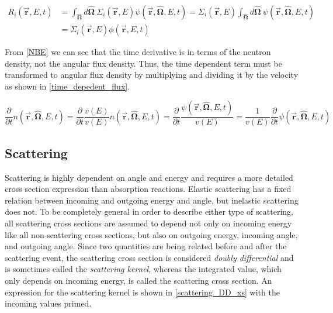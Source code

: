 \begin{align}
\label{scalar_flux_RR}
 R_i(\boldsymbol{\vec{r}},E,t) &= \int_{\boldsymbol{\hat{\Omega}}} d\boldsymbol{\hat{\Omega}} \: \Sigma_i(\boldsymbol{\vec{r}},E) \psi(\boldsymbol{\vec{r}},\boldsymbol{\hat{\Omega}},E,t) = \Sigma_i(\boldsymbol{\vec{r}},E) \int_{\boldsymbol{\hat{\Omega}}} d\boldsymbol{\hat{\Omega}} \: \psi(\boldsymbol{\vec{r}},\boldsymbol{\hat{\Omega}},E,t) \nonumber\\
 &= \Sigma_i(\boldsymbol{\vec{r}},E) \phi(\boldsymbol{\vec{r}},E,t)
 \end{align}
 
From \eqref{NBE} we can see that the time derivative is in terms of the neutron density, not the angular flux density.  Thus, the time dependent term must be transformed to angular flux density by multiplying and dividing it by the velocity as shown in \eqref{time_depedent_flux}.

\begin{equation}
\label{time_depedent_flux}
\frac{\partial }{\partial t}n(\boldsymbol{\vec{r}},\boldsymbol{\hat{\Omega}},E,t) = \frac{\partial }{\partial t}  \frac{v(E)}{v(E)} n(\boldsymbol{\vec{r}},\boldsymbol{\hat{\Omega}},E,t) =  \frac{\partial }{\partial t}  \frac{\psi(\boldsymbol{\vec{r}},\boldsymbol{\hat{\Omega}},E,t)}{v(E)} = \frac{1}{v(E)} \frac{\partial }{\partial t}\psi(\boldsymbol{\vec{r}},\boldsymbol{\hat{\Omega}},E,t)
\end{equation}

\subsection{Scattering}

Scattering is highly dependent on angle and energy and requires a more detailed cross section expression than absorption reactions.  Elastic scattering has a fixed relation between incoming and outgoing energy and angle, but inelastic scattering does not. To be completely general in order to describe either type of scattering, all scattering cross sections are assumed to depend not only on incoming energy like all non-scattering cross sections, but also on outgoing energy, incoming angle, and outgoing angle.  Since two quantities are being related before and after the scattering event, the scattering cross section is considered \emph{doubly differential} and is sometimes called the \emph{scattering kernel}, whereas the integrated value, which only depends on incoming energy, is called the scattering cross section.   An expression for the scattering kernel is shown in \eqref{scattering_DD_xs} with the incoming values primed.

